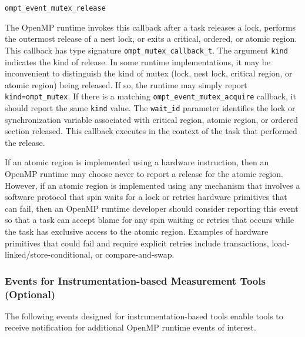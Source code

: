 \documentclass{article}
\newcommand{\descheader}[1]{{\needspace{3\baselineskip}\vspace{1em}\noindent \fbox{#1}}}
\begin{document}
\begin{description}

\item \verb|ompt_event_mutex_release| 

   The OpenMP runtime invokes this callback after a task releases a lock, performs the outermost release of a nest lock, or exits a critical, ordered, 
   or atomic region. 
   This callback has type signature \verb|ompt_mutex_callback_t|. 
   The argument \verb|kind| indicates the kind of release. In some runtime implementations, it may be inconvenient to distinguish the kind of mutex (lock, nest lock, 
   critical region, or atomic region) being released. If so, the runtime may simply report \verb|kind=|\verb|ompt_mutex|. If there is a matching 
   \verb|ompt_event_mutex_acquire| callback, it should report the same \verb|kind| value. 
   The \verb|wait_id| parameter identifies the lock or synchronization variable
   associated with critical region, atomic region, or ordered section released. This callback executes in the context of the task that performed the release. 
   
   If an atomic region is implemented using a hardware instruction, then an OpenMP runtime may choose never to report a release for the atomic region. 
   However, if an atomic region is implemented  using any mechanism that involves a software protocol that spin waits for a lock or retries hardware primitives
   that can fail, then an OpenMP 
   runtime developer should consider reporting this event so that a task can accept blame for any spin waiting or retries that occurs while the task has 
   exclusive access to the atomic region.
   Examples of hardware primitives that could fail and require explicit retries include transactions,  
   load-linked/store-conditional, or compare-and-swap.
   
\end{description}

\subsubsection{Events for Instrumentation-based Measurement Tools (Optional)}
\label{sec:trace-events}

The following events designed for instrumentation-based tools enable tools to receive notification for additional OpenMP runtime events of interest.

\descheader{Tasking}
\end{document}
